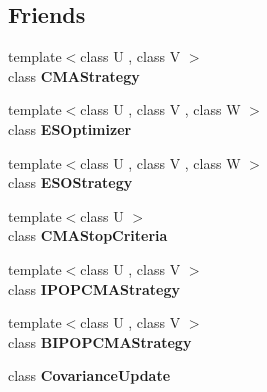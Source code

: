 \subsection*{Friends}
\begin{DoxyCompactItemize}
\item 
\hypertarget{classlibcmaes_1_1CMASolutions_a07488b7628d12135de0243eb796e53a9}{{\footnotesize template$<$class U , class V $>$ }\\class {\bfseries C\-M\-A\-Strategy}}\label{classlibcmaes_1_1CMASolutions_a07488b7628d12135de0243eb796e53a9}

\item 
\hypertarget{classlibcmaes_1_1CMASolutions_a8a4e3d4591e726bcf197f8d006c4ec76}{{\footnotesize template$<$class U , class V , class W $>$ }\\class {\bfseries E\-S\-Optimizer}}\label{classlibcmaes_1_1CMASolutions_a8a4e3d4591e726bcf197f8d006c4ec76}

\item 
\hypertarget{classlibcmaes_1_1CMASolutions_ad6ebfad69a17421ae398d90c542aea13}{{\footnotesize template$<$class U , class V , class W $>$ }\\class {\bfseries E\-S\-O\-Strategy}}\label{classlibcmaes_1_1CMASolutions_ad6ebfad69a17421ae398d90c542aea13}

\item 
\hypertarget{classlibcmaes_1_1CMASolutions_aff56187b22ef0b3164ed7711dc0c82c3}{{\footnotesize template$<$class U $>$ }\\class {\bfseries C\-M\-A\-Stop\-Criteria}}\label{classlibcmaes_1_1CMASolutions_aff56187b22ef0b3164ed7711dc0c82c3}

\item 
\hypertarget{classlibcmaes_1_1CMASolutions_a083272459c67810fd3e8b1702c7d67c2}{{\footnotesize template$<$class U , class V $>$ }\\class {\bfseries I\-P\-O\-P\-C\-M\-A\-Strategy}}\label{classlibcmaes_1_1CMASolutions_a083272459c67810fd3e8b1702c7d67c2}

\item 
\hypertarget{classlibcmaes_1_1CMASolutions_ae97315b6fb514c42e8c3973f362ef2a2}{{\footnotesize template$<$class U , class V $>$ }\\class {\bfseries B\-I\-P\-O\-P\-C\-M\-A\-Strategy}}\label{classlibcmaes_1_1CMASolutions_ae97315b6fb514c42e8c3973f362ef2a2}

\item 
\hypertarget{classlibcmaes_1_1CMASolutions_aa62543a4caa6d6b288bb58ca5411539c}{class {\bfseries Covariance\-Update}}\label{classlibcmaes_1_1CMASolutions_aa62543a4caa6d6b288bb58ca5411539c}


\end{DoxyCompactItemize}
